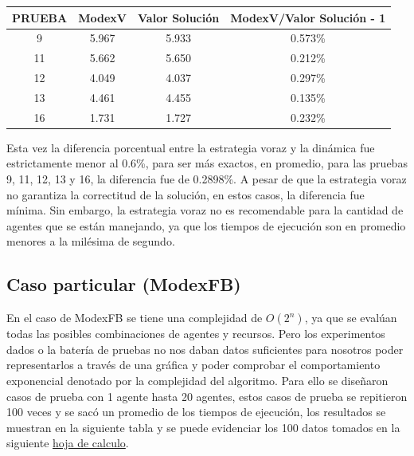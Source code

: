 \documentclass[letterpaper,10pt]{article}
\begin{document}
\begin{table}[H]
  \centering
  \begin{tabular}{|c|c|c|c|}
    \hline
    \textbf{PRUEBA} & \textbf{ModexV} & \textbf{Valor Solución} & \textbf{ModexV/Valor Solución - 1} \\
    \hline
    9 & 5.967 & 5.933 & 0.573\% \\
    11 & 5.662 & 5.650 & 0.212\% \\
    12 & 4.049 & 4.037 & 0.297\% \\
    13 & 4.461 & 4.455 & 0.135\% \\
    16 & 1.731 & 1.727 & 0.232\% \\
    \hline    
  \end{tabular}  
\end{table}
Esta vez la diferencia porcentual entre la estrategia voraz y la dinámica fue estrictamente menor al 0.6\%, para ser más exactos, en promedio, para las pruebas 9, 11, 12, 13 y 16, la diferencia fue de 0.2898\%. A pesar de que la estrategia voraz no garantiza la correctitud de la solución, en estos casos, la diferencia fue mínima. Sin embargo, la estrategia voraz no es recomendable para la cantidad de agentes que se están manejando, ya que los tiempos de ejecución son en promedio menores a la milésima de segundo.
\subsection{Caso particular (ModexFB)}
En el caso de ModexFB se tiene una complejidad de \(O(2^n)\), ya que se evalúan todas las posibles combinaciones de agentes y recursos. Pero los experimentos dados o la batería de pruebas no nos daban datos suficientes para nosotros poder representarlos a través de una gráfica y poder comprobar el comportamiento exponencial denotado por la complejidad del algoritmo.
Para ello se diseñaron casos de prueba con 1 agente hasta 20 agentes, estos casos de prueba se repitieron 100 veces y se sacó un promedio de los tiempos de ejecución, los resultados se muestran en la siguiente tabla y se puede evidenciar los 100 datos tomados en la siguiente \href{https://1drv.ms/x/s!Au19Z890RbcYgYp-EkAe5e8Z_uKeHA?e=RUO2BH}{hoja de calculo}.
\end{document}
